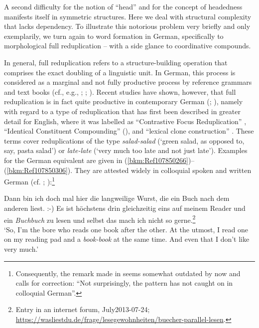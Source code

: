 \documentclass[output=paper
  ,nobabel
  ,draftmode
  ,colorlinks, citecolor=brown
]{langscibook}
\begin{document}
A second difficulty for the notion of ``head'' and for the concept of headedness manifests itself in
symmetric structures. Here we deal with structural complexity that lacks dependency. To illustrate
this notorious problem very briefly and only exemplarily, we turn again to word formation in German,
specifically to morphological full reduplication – with a side glance to coordinative compounds.

In general, full reduplication refers to a structure-building operation that comprises the exact
doubling of a linguistic unit. In German, this process is considered as a marginal and not fully
productive process by reference grammars and text books (cf., e.g., \citealt[104]{OrtnerOrtner1984};
\citealt[43]{Lohde2006}; \citealt[94--96]{FleischerBarz2012}). Recent studies have shown, however,
that full reduplication is in fact quite productive in contemporary German
(\citealt{Finkbeiner2014}; \citealt{Freywald2015}), namely with regard to a type of reduplication
that has first been described in greater detail for English, where it was labelled as ``Contrastive
Focus Reduplication'' \citep{GhomeshiEtAl2004}, ``Identical Constituent Compounding''
(\citealt{Hohenhaus1996,Hohenhaus2004}), and ``lexical clone construction'' \citep{Horn2018}. These terms
cover reduplications of the type \emph{salad-salad} (`green salad, as opposed to, say, pasta salad')
or \emph{late-late} (`very much too late and not just late'). Examples for the German equivalent are
given in (\ref{bkm:Ref107850266})–(\ref{bkm:Ref107850306}). They are attested widely in colloquial
spoken and written German (cf. \citealt{Finkbeiner2014};
\citealt{Freywald2015}):\footnote{Consequently, the remark made in 
  \citet[202]{StolzStrohUrdze2011} seems somewhat outdated by now and calls for correction: ``Not surprisingly,
  the pattern has not caught on in colloquial German''.}


\ea
\label{bkm:Ref107850266}%
       Dann bin ich doch mal hier die langweilige Wurst, die ein Buch nach dem anderen liest. :-) Es ist höchstens drin gleichzeitig eins auf meinem Reader und ein \emph{Buchbuch} zu lesen und selbst das mach ich nicht so gerne.\footnote{Entry in an internet forum, July2013-07-24; \url{https://wasliestdu.de/frage/lesegewohnheiten/buecher-parallel-lesen}.}\\
`So, I'm the bore who reads one book after the other. At the utmost, I read one on my reading pad and a \emph{book-book} at the same time. And even that I don't like very much.'
\z
\end{document}
